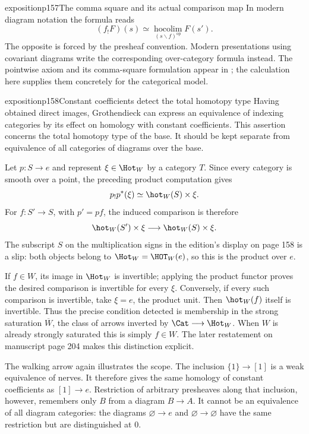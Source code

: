\begin{dcomment}{exposition}{p157}{The comma square and its actual comparison map}
In modern diagram notation the formula reads
\[
 (f_!F)(s)\simeq
 \operatorname*{hocolim}_{(s\backslash f)^{\mathrm{op}}}F(s').
\]
The opposite is forced by the presheaf convention. Modern presentations using covariant diagrams write the corresponding over-category formula instead. The pointwise axiom and its comma-square formulation appear in \citet[Definition~1.5 and Proposition~1.26]{Groth2013}; the calculation here supplies them concretely for the categorical model.
\end{dcomment}

\begin{dcomment}{exposition}{p158}{Constant coefficients detect the total homotopy type}
Having obtained direct images, Grothendieck can express an equivalence of indexing categories by its effect on homology with constant coefficients. This assertion concerns the total homotopy type of the base. It should be kept separate from equivalence of all categories of diagrams over the base.

Let $p:S\longrightarrow e$ and represent $\xi\in\Hot_W$ by a category $T$. Since every category is smooth over a point, the preceding product computation gives
\[
 p_!p^*(\xi)\simeq\hot_W(S)\times\xi.
\]
For $f:S'\longrightarrow S$, with $p'=pf$, the induced comparison is therefore
\[
 \hot_W(S')\times\xi\longrightarrow\hot_W(S)\times\xi.
\]
The subscript $S$ on the multiplication signs in the edition's display on page 158 is a slip: both objects belong to $\Hot_W=\HOT_W(e)$, so this is the product over $e$.

If $f\in W$, its image in $\Hot_W$ is invertible; applying the product functor proves the desired comparison is invertible for every $\xi$. Conversely, if every such comparison is invertible, take $\xi=e$, the product unit. Then $\hot_W(f)$ itself is invertible. Thus the precise condition detected is membership in the strong saturation $\overline W$, the class of arrows inverted by $\Cat\longrightarrow\Hot_W$. When $W$ is already strongly saturated this is simply $f\in W$. The later restatement on manuscript page 204 makes this distinction explicit.

The walking arrow again illustrates the scope. The inclusion $\{1\}\longrightarrow[1]$ is a weak equivalence of nerves. It therefore gives the same homology of constant coefficients as $[1]\longrightarrow e$. Restriction of arbitrary presheaves along that inclusion, however, remembers only $B$ from a diagram $B\longrightarrow A$. It cannot be an equivalence of all diagram categories: the diagrams $\varnothing\longrightarrow e$ and $\varnothing\longrightarrow\varnothing$ have the same restriction but are distinguished at $0$.


\end{dcomment}
